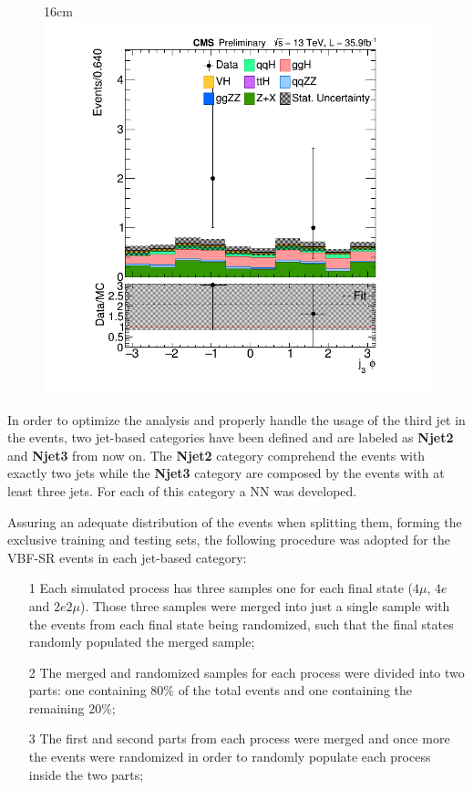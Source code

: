 \begin{figure}[hbtp]{16cm}
{		\includegraphics[scale=0.23,trim={2cm 1cm 2cm 1cm},clip]{ChapterAnalysis/figs/vbf_j3_phi}
	}	
	\label{fig:ann_input_variables}
\end{figure}


In order to optimize the analysis and properly handle the usage of the third jet in the events, two jet-based categories have been defined and are labeled as \textbf{Njet2} and \textbf{Njet3} from now on. The \textbf{Njet2} category comprehend the events with exactly two jets while the \textbf{Njet3} category are composed by the events with at least three jets. For each of this category a NN was developed.

Assuring an adequate distribution of the events when splitting them, forming the exclusive training and testing sets, the following procedure was adopted for the VBF-SR events in each jet-based category:
\begin{itemize}
	\item[1] Each simulated process has three samples one for each final state ($4\mu$, $4e$ and $2e2\mu$). Those three samples were merged into just a single sample with the events from each final state being randomized, such that the final states randomly populated the merged sample;
	\item[2] The merged and randomized samples for each process were divided into two parts: one containing $80\%$ of the total events and one containing the remaining $20\%$;
	\item[3] The first and second parts from each process were merged and once more the events were randomized in order to randomly populate each process inside the two parts;
\end{itemize}

